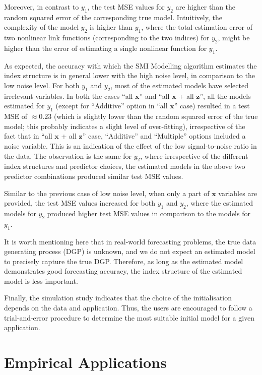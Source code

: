 \documentclass[11pt,a4paper,]{article}
\begin{document}
Moreover, in contrast to \(y_{1}\), the test MSE values for \(y_{2}\)
are higher than the random squared error of the corresponding true
model. Intuitively, the complexity of the model \(y_{2}\) is higher than
\(y_{1}\), where the total estimation error of two nonlinear link
functions (corresponding to the two indices) for \(y_{2}\), might be
higher than the error of estimating a single nonlinear function for
\(y_{1}\).

As expected, the accuracy with which the SMI Modelling algorithm
estimates the index structure is in general lower with the high noise
level, in comparison to the low noise level. For both \(y_{1}\) and
\(y_{2}\), most of the estimated models have selected irrelevant
variables. In both the cases ``all \(\bm{x}\)'' and ``all \(\bm{x}\) +
all \(\bm{z}\)'', all the models estimated for \(y_{1}\) (except for
``Additive'' option in ``all \(\bm{x}\)'' case) resulted in a test MSE
of \(\approx 0.23\) (which is slightly lower than the random squared
error of the true model; this probably indicates a slight level of
over-fitting), irrespective of the fact that in ``all \(\bm{x}\) + all
\(\bm{z}\)'' case, ``Additive'' and ``Multiple'' options included a
noise variable. This is an indication of the effect of the low
signal-to-noise ratio in the data. The observation is the same for
\(y_{2}\), where irrespective of the different index structures and
predictor choices, the estimated models in the above two predictor
combinations produced similar test MSE values.

Similar to the previous case of low noise level, when only a part of
\(\bm{x}\) variables are provided, the test MSE values increased for
both \(y_{1}\) and \(y_{2}\), where the estimated models for \(y_{2}\)
produced higher test MSE values in comparison to the models for
\(y_{1}\).

It is worth mentioning here that in real-world forecasting problems, the
true data generating process (DGP) is unknown, and we do not expect an
estimated model to precisely capture the true DGP. Therefore, as long as
the estimated model demonstrates good forecasting accuracy, the index
structure of the estimated model is less important.

Finally, the simulation study indicates that the choice of the
initialisation depends on the data and application. Thus, the users are
encouraged to follow a trial-and-error procedure to determine the most
suitable initial model for a given application.

\hypertarget{sec-application}{%
\section{Empirical Applications}\label{sec-application}}
\end{document}

